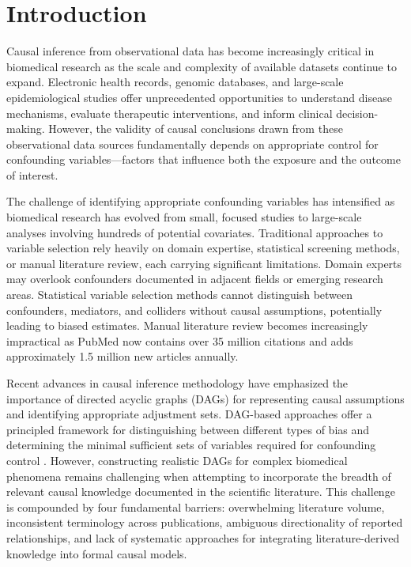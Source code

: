 \documentclass[preprint,12pt,numbers,sort&compress]{elsarticle}
\begin{document}
\section{Introduction}
\label{sec:introduction}

Causal inference from observational data has become increasingly critical in biomedical research as the scale and complexity of available datasets continue to expand. \cite{hernan2020causal} Electronic health records, genomic databases, and large-scale epidemiological studies offer unprecedented opportunities to understand disease mechanisms, evaluate therapeutic interventions, and inform clinical decision-making. \cite{hernan2016using} However, the validity of causal conclusions drawn from these observational data sources fundamentally depends on appropriate control for confounding variables—factors that influence both the exposure and the outcome of interest. \cite{pearl2009causality}

The challenge of identifying appropriate confounding variables has intensified as biomedical research has evolved from small, focused studies to large-scale analyses involving hundreds of potential covariates. Traditional approaches to variable selection rely heavily on domain expertise, statistical screening methods, or manual literature review, each carrying significant limitations.\cite{shrier2008reducing} Domain experts may overlook confounders documented in adjacent fields or emerging research areas. Statistical variable selection methods cannot distinguish between confounders, mediators, and colliders without causal assumptions, potentially leading to biased estimates. Manual literature review becomes increasingly impractical as PubMed now contains over 35 million citations and adds approximately 1.5 million new articles annually.

Recent advances in causal inference methodology have emphasized the importance of directed acyclic graphs (DAGs) for representing causal assumptions and identifying appropriate adjustment sets. \cite{pearl2009causality, shrier2008reducing} DAG-based approaches offer a principled framework for distinguishing between different types of bias and determining the minimal sufficient sets of variables required for confounding control \cite{textor2016robust}. However, constructing realistic DAGs for complex biomedical phenomena remains challenging when attempting to incorporate the breadth of relevant causal knowledge documented in the scientific literature. This challenge is compounded by four fundamental barriers: overwhelming literature volume, inconsistent terminology across publications, ambiguous directionality of reported relationships, and lack of systematic approaches for integrating literature-derived knowledge into formal causal models.
\end{document}
